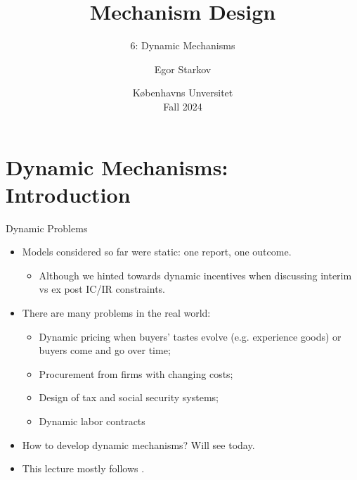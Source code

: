 \documentclass[english,10pt
,aspectratio=169
]{beamer}
\title{Mechanism Design}
\subtitle{6: Dynamic Mechanisms}
\author{Egor Starkov}
\date{K{\o}benhavns Unversitet \\
	Fall 2024}
\begin{document}
	\frame[plain]{\titlepage}


\section{Dynamic Mechanisms: Introduction}

\begin{frame}{Dynamic Problems}
\begin{itemize}
	\item Models considered so far were static: one report, one outcome.
	\begin{itemize}
		\item Although we hinted towards dynamic incentives when discussing interim vs ex post IC/IR constraints.
	\end{itemize}
	\item There are many  problems in the real world:
	\begin{itemize}
		\item Dynamic pricing when buyers' tastes evolve (e.g. experience goods) or buyers come and go over time;
		\item Procurement from firms with changing costs;
		\item Design of tax and social security systems;
		\item Dynamic labor contracts
	\end{itemize}
	\item How to develop dynamic mechanisms? Will see today.
	\item This lecture mostly follows \cite{bergemann_dynamic_2019}.
\end{itemize}
\end{frame}
\end{document}
